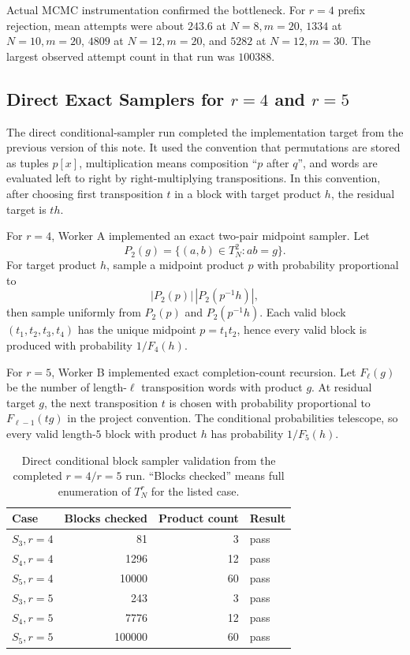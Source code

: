 Actual MCMC instrumentation confirmed the bottleneck.  For $r=4$ prefix
rejection, mean attempts were about $243.6$ at $N=8,m=20$, $1334$ at
$N=10,m=20$, $4809$ at $N=12,m=20$, and $5282$ at $N=12,m=30$.  The largest
observed attempt count in that run was $100388$.


\subsection{\texorpdfstring{Direct Exact Samplers for $r=4$ and $r=5$}{Direct Exact Samplers for r=4 and r=5}}

The direct conditional-sampler run completed the implementation target from the
previous version of this note.  It used the convention that permutations are
stored as tuples $p[x]$, multiplication means composition ``$p$ after $q$'',
and words are evaluated left to right by right-multiplying transpositions.  In
this convention, after choosing first transposition $t$ in a block with target
product $h$, the residual target is $th$.

For $r=4$, Worker A implemented an exact two-pair midpoint sampler.  Let
\[
  P_2(g)=\{(a,b)\in T_N^2 : ab=g\}.
\]
For target product $h$, sample a midpoint product $p$ with probability
proportional to
\[
  |P_2(p)|\,|P_2(p^{-1}h)|,
\]
then sample uniformly from $P_2(p)$ and $P_2(p^{-1}h)$.  Each valid block
$(t_1,t_2,t_3,t_4)$ has the unique midpoint $p=t_1t_2$, hence every valid
block is produced with probability $1/F_4(h)$.

For $r=5$, Worker B implemented exact completion-count recursion.  Let
$F_\ell(g)$ be the number of length-$\ell$ transposition words with product
$g$.  At residual target $g$, the next transposition $t$ is chosen with
probability proportional to $F_{\ell-1}(tg)$ in the project convention.  The
conditional probabilities telescope, so every valid length-$5$ block with
product $h$ has probability $1/F_5(h)$.

\begin{table}[ht]
\centering
\begin{tabular}{lrrl}
\toprule
Case & Blocks checked & Product count & Result \\
\midrule
$S_3,r=4$ & 81 & 3 & pass \\
$S_4,r=4$ & 1296 & 12 & pass \\
$S_5,r=4$ & 10000 & 60 & pass \\
$S_3,r=5$ & 243 & 3 & pass \\
$S_4,r=5$ & 7776 & 12 & pass \\
$S_5,r=5$ & 100000 & 60 & pass \\
\bottomrule
\end{tabular}
\caption{Direct conditional block sampler validation from the completed
$r=4/r=5$ run.  ``Blocks checked'' means full enumeration of $T_N^r$ for the
listed case.}
\label{tab:direct-block-validation}
\end{table}

